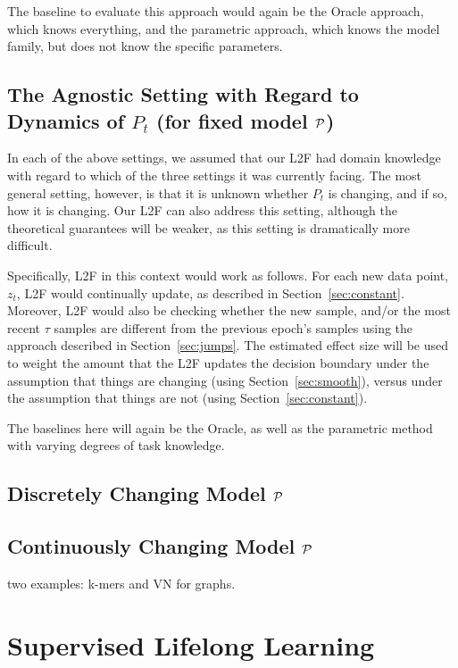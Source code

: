 \documentclass{article}
\begin{document}
The baseline to evaluate this approach would again be the Oracle approach, which knows everything, and the parametric approach, which knows the model family, but does not know the specific parameters. 




\subsection{The Agnostic Setting with Regard to Dynamics of $P_t$ (for fixed model $\mathcal{P}$)}
\label{sec:combo}


In each of the above settings, we assumed that our L2F had domain knowledge with regard to which of the three settings it was currently facing.  The most general setting, however, is that it is unknown whether $P_t$ is changing, and if so, how it is changing.  Our L2F can also address this setting, although the theoretical guarantees will be weaker, as this setting is dramatically more difficult.  

Specifically, L2F in this context would work as follows.  For each new data point, $z_t$, L2F would continually update, as described in Section~\ref{sec:constant}.  Moreover, L2F would also be checking whether the new sample, and/or the most recent $\tau$ samples are different from the previous epoch's samples using the approach described in Section~\ref{sec:jumps}.  The estimated effect size will be used to weight the amount that the L2F updates the decision boundary under the assumption that things are changing (using Section~\ref{sec:smooth}), versus under the assumption that things are not (using Section~\ref{sec:constant}).  

The baselines here will again be the Oracle, as well as the parametric method with varying degrees of task knowledge. 


\subsection{Discretely Changing Model $\mathcal{P}$}



\subsection{Continuously Changing Model $\mathcal{P}$}


two examples: k-mers and VN for graphs.


\section{Supervised Lifelong Learning}
\label{sec:transfer}
\end{document}
